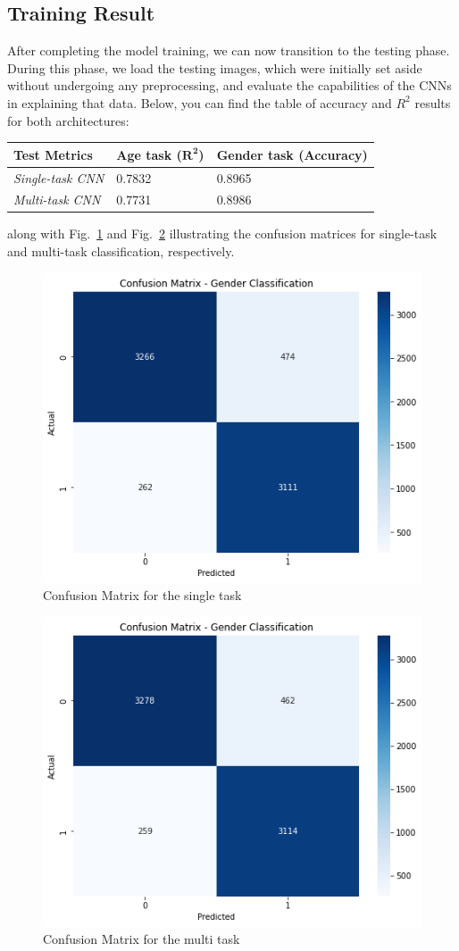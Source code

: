 \subsection{Training Result}

After completing the model training, we can now transition to the testing
phase. During this phase, we load the testing images, which were initially
set aside without undergoing any preprocessing, and evaluate
the capabilities of the CNNs in explaining that data.
Below, you can find the table of accuracy and $R^2$ results for both
architectures:
\begin{table}[H]
    \centering
    \begin{tabular}{@{}lll@{}}
    \toprule
    Test Metrics & \textbf{Age task ($\mathbf{R^2}$)} & \textbf{Gender task (Accuracy)} \\ \midrule
    \textit{Single-task CNN} & 0.7832            & 0.8965               \\
    \textit{Multi-task CNN}  & 0.7731            & 0.8986               \\ \bottomrule
    \end{tabular}
\end{table}
along with Fig.~\ref{6mat} and Fig.~\ref{7mat} illustrating the
confusion matrices for single-task
and multi-task classification, respectively.
\begin{figure}[htbp]
    \centerline{\includegraphics[width=.45\textwidth]{images/testing/mat_single.png}}
    \caption{Confusion Matrix for the single task}
    \label{6mat}
\end{figure}
\begin{figure}[htbp]
    \centerline{\includegraphics[width=.45\textwidth]{images/testing/mat_multi.png}}
    \caption{Confusion Matrix for the multi task}
    \label{7mat}
\end{figure}
